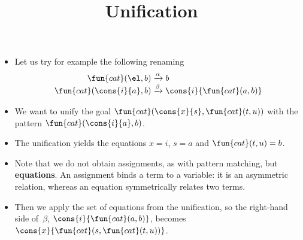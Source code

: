 \documentclass[wide]{slides}
\begin{document}
\begin{slide}
  \title{Unification}

  \begin{itemize}

    \item Let us try for example the following renaming
      \begin{align*}
        \fun{cat}(        \el,b) &\xrightarrow{\alpha} b\\
        \fun{cat}(\cons{i}{a},b) &\xrightarrow{\smash{\beta}}
        \cons{i}{\fun{cat}(a,b)}
      \end{align*}

    \item We want to unify the goal
      \(\fun{cat}(\cons{x}{s},\fun{cat}(t,u))\) with the pattern
      \(\fun{cat}(\cons{i}{a},b)\).

    \item The unification yields the equations \(x = i\), \(s = a\)
      and \(\fun{cat}(t,u) = b\).

    \item Note that we do not obtain assignments, as with pattern
      matching, but \textbf{equations}. An assignment binds a term to
      a variable: it is an asymmetric relation, whereas an equation
      symmetrically relates two terms.

    \item Then we apply the set of equations from the unification, so
      the right\hyp{}hand side of~\(\beta\),
      \(\cons{i}{\fun{cat}(a,b)}\), becomes
      \(\cons{x}{\fun{cat}(s,\fun{cat}(t,u))}\).

  \end{itemize}

\end{slide}
\end{document}
